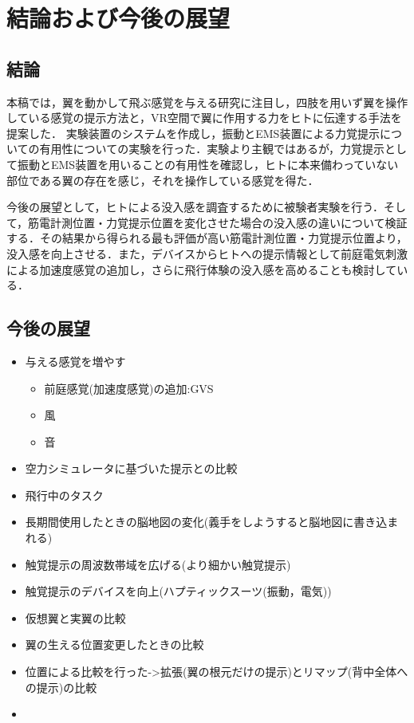\chapter[結論および今後の展望]%
        {結論および今後の展望}

\section{結論}
    本稿では，翼を動かして飛ぶ感覚を与える研究に注目し，四肢を用いず翼を操作している感覚の提示方法と，VR空間で翼に作用する力をヒトに伝達する手法を提案した．
    実験装置のシステムを作成し，振動とEMS装置による力覚提示についての有用性についての実験を行った．実験より主観ではあるが，力覚提示として振動とEMS装置を用いることの有用性を確認し，ヒトに本来備わっていない部位である翼の存在を感じ，それを操作している感覚を得た．
  
    今後の展望として，ヒトによる没入感を調査するために被験者実験を行う．そして，筋電計測位置・力覚提示位置を変化させた場合の没入感の違いについて検証する．その結果から得られる最も評価が高い筋電計測位置・力覚提示位置より，没入感を向上させる．また，デバイスからヒトへの提示情報として前庭電気刺激による加速度感覚\cite{maeda2005shaking}\cite{青山一真2014前庭電気刺激における逆方向不感電流を用いた加速度感覚の増強}の追加し，さらに飛行体験の没入感を高めることも検討している．
  
\section{今後の展望}
    \begin{itemize}
    \item 与える感覚を増やす
        \begin{itemize}
        \item 前庭感覚(加速度感覚)の追加:GVS
        \item 風
        \item 音
        \end{itemize}
    \item 空力シミュレータに基づいた提示との比較
    \item 飛行中のタスク
    \item 長期間使用したときの脳地図の変化(義手をしようすると脳地図に書き込まれる)
    \item 触覚提示の周波数帯域を広げる(より細かい触覚提示)
    \item 触覚提示のデバイスを向上(ハプティックスーツ(振動，電気))
    \item 仮想翼と実翼の比較
    \item 翼の生える位置変更したときの比較
    \item 位置による比較を行った->拡張(翼の根元だけの提示)とリマップ(背中全体への提示)の比較
    \item 
    \end{itemize}